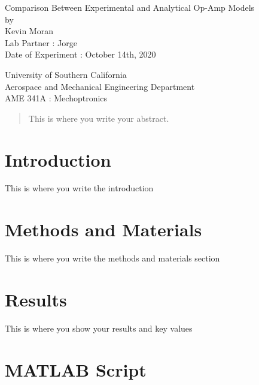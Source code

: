 \documentclass[letterpaper,12pt]{article}
\begin{document}
\begin{titlepage}
 \begin{center}
 \vspace*{1in}
{\Huge Comparison Between Experimental and Analytical Op-Amp Models}\\
    \bigskip
    by\\
    \bigskip
    {\large Kevin Moran} \\
    \bigskip
    Lab Partner : Jorge\\
    Date of Experiment : October 14th, 2020

    \bigskip\bigskip\bigskip%
    University of Southern California\\
    Aerospace and Mechanical Engineering Department\\
    AME 341A : Mechoptronics
 \end{center}
\end{titlepage}




\begin{abstract}
    This is where you write your abstract.
\end{abstract}

\section{Introduction}
This is where you write the introduction

\section{Methods and Materials}
This is where you write the methods and materials section

\section{Results}
This is where you show your results and key values

\section{MATLAB Script}

\end{document}
